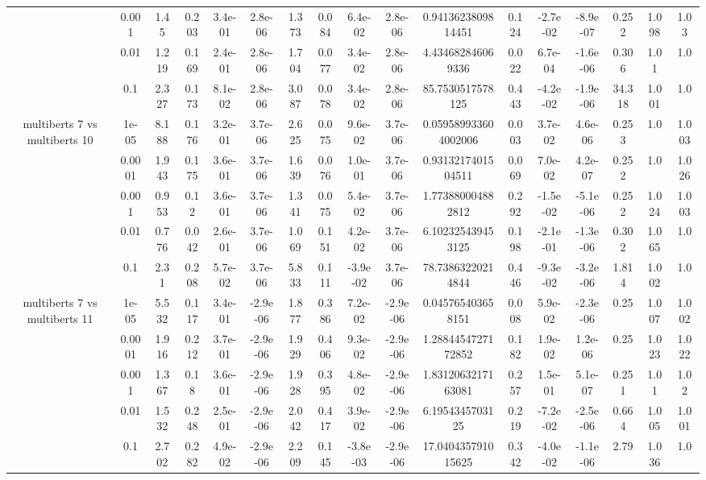 \begin{tabular}{|c|c|c|c|c|c|c|c|c|c|c|c|c|c|c|c|c|}
 & 0.001 & 1.45 & 0.203 & 3.4e-01 & 2.8e-06 & 1.373 & 0.084 & 6.4e-02 & 2.8e-06 & 0.9413623809814451 & 0.124 & -2.7e-02 & -8.9e-07 & 0.252 & 1.098 & 1.03 \\
 & 0.01 & 1.219 & 0.169 & 2.4e-01 & 2.8e-06 & 1.704 & 0.077 & 3.4e-02 & 2.8e-06 & 4.434682846069336 & 0.022 & 6.7e-04 & -1.6e-06 & 0.306 & 1.01 & 1.0 \\
 & 0.1 & 2.327 & 0.173 & 8.1e-02 & 2.8e-06 & 3.087 & 0.078 & 3.4e-02 & 2.8e-06 & 85.7530517578125 & 0.443 & -4.2e-02 & -1.9e-06 & 34.318 & 1.001 & 1.0 \\
\hline
\multirow{5}{*}{multiberts 7 vs multiberts 10} & 1e-05 & 8.188 & 0.176 & 3.2e-01 & 3.7e-06 & 2.625 & 0.075 & 9.6e-02 & 3.7e-06 & 0.059589933604002006 & 0.003 & 3.7e-02 & 4.6e-06 & 0.253 & 1.0 & 1.003 \\
 & 0.0001 & 1.943 & 0.175 & 3.6e-01 & 3.7e-06 & 1.639 & 0.076 & 1.0e-01 & 3.7e-06 & 0.9313217401504511 & 0.069 & 7.0e-02 & 4.2e-07 & 0.252 & 1.0 & 1.026 \\
 & 0.001 & 0.953 & 0.12 & 3.6e-01 & 3.7e-06 & 1.341 & 0.075 & 5.4e-02 & 3.7e-06 & 1.773880004882812 & 0.292 & -1.5e-02 & -5.1e-06 & 0.252 & 1.024 & 1.003 \\
 & 0.01 & 0.776 & 0.042 & 2.6e-01 & 3.7e-06 & 1.069 & 0.151 & 4.2e-02 & 3.7e-06 & 6.102325439453125 & 0.198 & -2.1e-01 & -1.3e-06 & 0.302 & 1.065 & 1.0 \\
 & 0.1 & 2.31 & 0.208 & 5.7e-02 & 3.7e-06 & 5.833 & 0.111 & -3.9e-02 & 3.7e-06 & 78.73863220214844 & 0.446 & -9.3e-02 & -3.2e-06 & 1.814 & 1.002 & 1.0 \\
\hline
\multirow{5}{*}{multiberts 7 vs multiberts 11} & 1e-05 & 5.532 & 0.117 & 3.4e-01 & -2.9e-06 & 1.877 & 0.386 & 7.2e-02 & -2.9e-06 & 0.045765403658151 & 0.008 & 5.9e-02 & -2.3e-06 & 0.25 & 1.007 & 1.002 \\
 & 0.0001 & 1.916 & 0.212 & 3.7e-01 & -2.9e-06 & 1.929 & 0.406 & 9.3e-02 & -2.9e-06 & 1.2884454727172852 & 0.182 & 1.9e-02 & 1.2e-06 & 0.25 & 1.023 & 1.022 \\
 & 0.001 & 1.367 & 0.18 & 3.6e-01 & -2.9e-06 & 1.928 & 0.395 & 4.8e-02 & -2.9e-06 & 1.8312063217163081 & 0.257 & 1.5e-01 & 5.1e-07 & 0.251 & 1.01 & 1.02 \\
 & 0.01 & 1.532 & 0.248 & 2.5e-01 & -2.9e-06 & 2.042 & 0.417 & 3.9e-02 & -2.9e-06 & 6.1954345703125 & 0.219 & -7.2e-02 & -2.5e-06 & 0.664 & 1.005 & 1.001 \\
 & 0.1 & 2.702 & 0.282 & 4.9e-02 & -2.9e-06 & 2.209 & 0.145 & -3.8e-03 & -2.9e-06 & 17.040435791015625 & 0.342 & -4.0e-02 & -1.1e-06 & 2.79 & 1.036 & 1.0 \\

\end{tabular}
